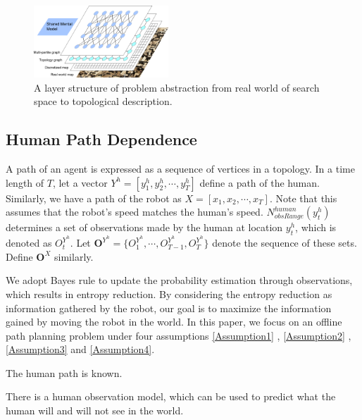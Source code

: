 \begin{figure}[htbp]
\centering
\includegraphics[width=0.45\textwidth]{./images/LayerStructure.pdf}
\caption{A layer structure of problem abstraction from real world of search space to topological description.}
\label{fig:LayerStructure}
\end{figure}

\subsection{Human Path Dependence}
\label{subsec:human_path_dependence}
 
A path of an agent is expressed as a sequence of vertices in a topology. 
In a time length of $ T $, let a vector $ Y^{h} = [y^{h}_{1}, y^{h}_{2} , \cdots , y^{h}_{T}] $ define a path of the human.
Similarly, we have a path of the robot as $ X = [x_{1}, x_{2} , \cdots , x_{T}] $.
Note that this assumes that the robot's speed matches the human's speed.
$ N^{human}_{obsRange}( y^{h}_{t} ) $ determines a set of observations made by the human at location $ y^{h}_{t} $, which is denoted as  $ O^{Y^{h}}_{t} $.
Let $ \mathbf{O}^{Y^{h}} = \{ O^{Y^{h}}_{1}, \cdots , O^{Y^{h}}_{T-1}, O^{Y^{h}}_{T} \} $ denote the sequence of these sets.
Define $ \mathbf{O}^{X} $ similarly.

We adopt Bayes rule to update the probability estimation through observations, which results in entropy reduction.
By considering the entropy reduction as information gathered by the robot, our goal is to maximize the information gained by moving the robot in the world.
In this paper, we focus on an offline path planning problem under four assumptions \ref{Assumption1} , \ref{Assumption2} , \ref{Assumption3} and \ref{Assumption4}.

\begin{Hyp}
\label{Assumption1}
The human path is known.
\end{Hyp}

\begin{Hyp}
\label{Assumption2}
There is a human observation model, which can be used to predict what the human will and will not see in the world.
\end{Hyp}

